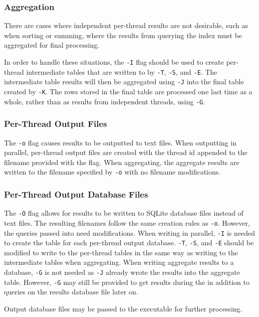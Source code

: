 \subsubsection{Aggregation}
There are cases where independent per-thread results are not
desirable, such as when sorting or summing, where the results from
querying the index must be aggregated for final processing.

In order to handle these situations, the \texttt{-I} flag should be
used to create per-thread intermediate tables that are written to by
\texttt{-T}, \texttt{-S}, and \texttt{-E}. The intermediate table
results will then be aggregated using \texttt{-J} into the final table
created by \texttt{-K}. The rows stored in the final table are
processed one last time as a whole, rather than as results from
independent threads, using \texttt{-G}.

\subsubsection{Per-Thread Output Files}
The \texttt{-o} flag causes results to be outputted to text
files. When outputting in parallel, per-thread output files are
created with the thread id appended to the filename provided with the
flag. When aggregating, the aggregate results are written to the
filename specified by \texttt{-o} with no filename modifications.

\subsubsection{Per-Thread Output Database Files}
The \texttt{-O} flag allows for results to be written to SQLite
database files instead of text files. The resulting filenames follow
the same creation rules as \texttt{-o}. However, the queries passed
into \gufiquery need modifications. When writing in parallel,
\texttt{-I} is needed to create the table for each per-thread output
database. \texttt{-T}, \texttt{-S}, and \texttt{-E} should be modified
to write to the per-thread tables in the same way as writing to the
intermediate tables when aggregating. When writing aggregate results
to a database, \texttt{-G} is not needed as \texttt{-J} already wrote
the results into the aggregate table. However, \texttt{-G} may still
be provided to get results during the \gufiquery in addition to
queries on the results database file later on.

Output database files may be passed to the \querydbs executable for
further processing.

